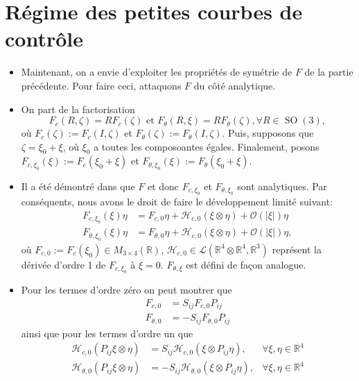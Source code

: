 \documentclass[10pt,a4paper]{article}
\theoremstyle{plain}
\theoremstyle{plain}
\theoremstyle{plain}
\theoremstyle{definition}
\theoremstyle{definition}
\theoremstyle{definition}
\theoremstyle{plain}
\newcommand{\R}{\mathbb{R}}
\newcommand{\h}{\mathcal{H}}
\DeclareMathOperator{\SO}{SO}
\begin{document}
\section{Régime des petites courbes de contrôle}
\begin{itemize}
\item Maintenant, on a envie d'exploiter les propriétés de symétrie de $F$ de la partie précédente. Pour faire ceci, attaquons $F$ du côté analytique. 

\item On part de la factorisation
\begin{equation}
\label{eq: reminder control system}
	F_{c}(R, \zeta) = R F_{c}(\zeta) \text{ et } F_{\theta}(R, \xi) = R F_{\theta}(\zeta), \forall R \in \SO(3),
\end{equation}
où $F_{c}(\zeta) := F_c(I, \zeta)$ et $F_{\theta}(\zeta) := F_{\theta}(I, \zeta)$. Puis, supposons que $\zeta = \xi_0 + \xi$, où $\xi_0$ a toutes les composoantes égales. Finalement, posons $F_{c, \xi_0}(\xi) := F_{c}(\xi_0 + \xi)$ et $F_{\theta, \xi_0}(\xi) := F_{\theta}(\xi_0 + \xi)$.

\item Il a été démontré dans \cite{Alouges2013} que $F$ et donc $F_{c, \xi_0}$ et $F_{\theta, \xi_0}$ sont analytiques. Par conséquents, nous avons le droit de faire le développement limité suivant:
\begin{align}
\label{eq: spatial control expansion}
	F_{c, \xi_0}(\xi)\eta &= F_{c, 0} \eta  + \h_{c,0}(\xi \otimes \eta) + \mathcal{O}(|\xi|)\eta\\
\label{eq: angular control expansion}
	F_{\theta, \xi_0}(\xi) \eta &= F_{\theta, 0} \eta + \h_{c, 0}(\xi \otimes \eta) + \mathcal{O}(|\xi|)\eta,
\end{align}
où $F_{c,0} := F_{c}(\xi_0) \in M_{3 \times 4}(\R)$, $\h_{c,0}\in \mathcal{L}(\R^4 \otimes \R^4, \R^3)$ représent la dérivée d'ordre 1 de $F_{c, \xi_0}$ à $\xi = 0$. $F_{\theta, \xi}$ est défini de façon analogue.

\item Pour les termes d'ordre zéro on peut montrer que
\begin{align}
\label{eq:zeroth_order_sym}
	F_{c,0} &= S_{ij} F_{c,0} P_{ij}\\
	F_{\theta, 0} &= -S_{ij} F_{\theta, 0} P_{ij}
\end{align}
ainsi que pour les termes d'ordre un que
\begin{align}
\label{eq:first_order_sym}
\h_{c,0}(P_{ij} \xi\otimes \eta) &= S_{ij} \h_{c,0}(\xi \otimes P_{ij} \eta), &\forall \xi, \eta \in \R^4\\
\h_{\theta,0}(P_{ij} \xi \otimes \eta) &= -S_{ij} \h_{\theta,0}(\xi \otimes P_{ij} \eta), &\forall \xi, \eta \in \R^4
\end{align}
\end{itemize}
\end{document}
